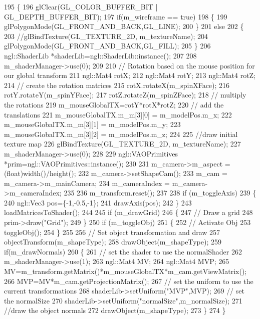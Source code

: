 \begin{DoxyCode}
195 \{
196   glClear(GL\_COLOR\_BUFFER\_BIT | GL\_DEPTH\_BUFFER\_BIT);
197   \textcolor{keywordflow}{if}(m_wireframe == \textcolor{keyword}{true})
198   \{
199     glPolygonMode(GL\_FRONT\_AND\_BACK,GL\_LINE);
200   \}
201   \textcolor{keywordflow}{else}
202   \{
203     \textcolor{comment}{//glBindTexture(GL\_TEXTURE\_2D, m\_textureName);}
204     glPolygonMode(GL\_FRONT\_AND\_BACK,GL\_FILL);
205   \}
206   ngl::ShaderLib *shaderLib=ngl::ShaderLib::instance();
207 
208   m_shaderManager->use(0);
209 
210   \textcolor{comment}{// Rotation based on the mouse position for our global transform}
211   ngl::Mat4 rotX;
212   ngl::Mat4 rotY;
213   ngl::Mat4 rotZ;
214   \textcolor{comment}{// create the rotation matrices}
215   rotX.rotateX(m_spinXFace);
216   rotY.rotateY(m_spinYFace);
217   rotZ.rotateZ(m_spinZFace);
218   \textcolor{comment}{// multiply the rotations}
219   m_mouseGlobalTX=rotY*rotX*rotZ;
220   \textcolor{comment}{// add the translations}
221   m_mouseGlobalTX.m\_m[3][0] = m_modelPos.m\_x;
222   m_mouseGlobalTX.m\_m[3][1] = m_modelPos.m\_y;
223   m_mouseGlobalTX.m\_m[3][2] = m_modelPos.m\_z;
224 
225   \textcolor{comment}{//draw initial texture map}
226   glBindTexture(GL\_TEXTURE\_2D, m_textureName);
227   m_shaderManager->use(0);
228 
229   ngl::VAOPrimitives *prim=ngl::VAOPrimitives::instance();
230 
231   m_camera->m_aspect = (float)width()/height();
232   m_camera->setShapeCam();
233   m_cam = m_camera->m_mainCamera;
234   m_cameraIndex = m_camera->m_cameraIndex;
235 
236   m_transform.reset();
237 
238   \textcolor{keywordflow}{if} (m_toggleAxis)
239   \{
240     ngl::Vec3 pos=\{-1,-0.5,-1\};
241     drawAxis(pos);
242   \}
243   loadMatricesToShader();
244 
245   \textcolor{keywordflow}{if} (m_drawGrid)
246   \{
247     \textcolor{comment}{// Draw a grid}
248     prim->draw(\textcolor{stringliteral}{"Grid"});
249   \}
250   \textcolor{keywordflow}{if} (m_toggleObj)
251   \{
252     \textcolor{comment}{// Activate Obj}
253     toggleObj();
254   \}
255 
256   \textcolor{comment}{// Set object transformation and draw}
257   objectTransform(m_shapeType);
258   drawObject(m_shapeType);
259   \textcolor{keywordflow}{if}(m_drawNormals)
260   \{
261     \textcolor{comment}{// set the shader to use the normalShader}
262     m_shaderManager->use(1);
263     ngl::Mat4 MV;
264     ngl::Mat4 MVP;
265     MV=m_transform.getMatrix()*m_mouseGlobalTX*m_cam.getViewMatrix();
266     MVP=MV*m_cam.getProjectionMatrix();
267     \textcolor{comment}{// set the uniform to use the current transformations}
268     shaderLib->setUniform(\textcolor{stringliteral}{"MVP"},MVP);
269     \textcolor{comment}{// set the normalSize}
270     shaderLib->setUniform(\textcolor{stringliteral}{"normalSize"},m_normalSize);
271     \textcolor{comment}{//draw the object normals}
272     drawObject(m_shapeType);
273   \}
274 \}
\end{DoxyCode}


